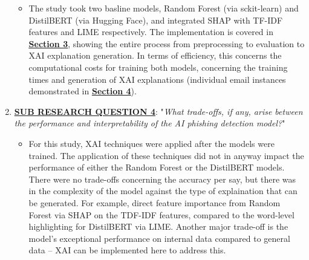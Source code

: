 \begin{enumerate}
  \begin{itemize}
    \item The study took two basline models, Random Forest (via sckit-learn) and DistilBERT (via Hugging Face), and integrated SHAP with TF-IDF features and LIME respectively. The implementation is covered in \hyperref[sec:3-research-methodology]{\uline{\textbf{Section 3}}}, showing the entire process from preprocessing to evaluation to XAI explanation generation. In terms of efficiency, this concerns the computational costs for training both models, concerning the training times and generation of XAI explanations (individual email instances demonstrated in \hyperref[sec:4-results]{\uline{\textbf{Section 4}}}).
  \end{itemize}
\item \uline{\textbf{SUB RESEARCH QUESTION 4}}: "\textit{What trade-offs, if any, arise between the performance and interpretability of the AI phishing detection model?}"
  \begin{itemize}
    \item For this study, XAI techniques were applied after the models were trained. The application of these techniques did not in anyway impact the performance of either the Random Forest or the DistilBERT models. There were no trade-offs concerning the accuracy per say, but there was in the complexity of the model against the type of explaination that can be generated. For example, direct feature importance from Random Forest via SHAP on the TDF-IDF features, compared to the word-level highlighting for DistilBERT via LIME. Another major trade-off is the model's exceptional performance on internal data compared to general data -- XAI can be implemented here to address this.
  \end{itemize}
\end{enumerate}
